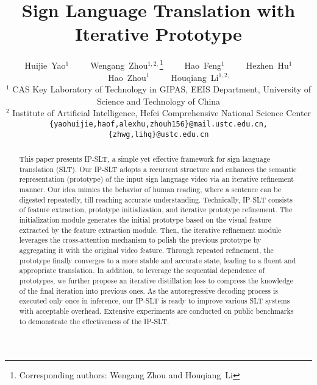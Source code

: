 \documentclass[10pt,twocolumn,letterpaper]{article}
\begin{document}
\title{Sign Language Translation with Iterative Prototype}

\author{Huijie~Yao$^{1}$~~~~~Wengang~Zhou$^{1,2,}$\thanks{Corresponding authors: Wengang Zhou and Houqiang~Li}~~~~~Hao~Feng$^{1}$~~~~~Hezhen~Hu$^{1}$~~~~~Hao~Zhou$^{1}$~~~~~Houqiang~Li$^{1,2,}$\footnotemark[1] \\
{\normalsize $^{1}$ CAS Key Laboratory of Technology in GIPAS, EEIS Department, University of Science and Technology of China} \\
{\normalsize $^{2}$ Institute of Artificial Intelligence, Hefei Comprehensive National Science Center} \\
{\tt\small \{yaohuijie,haof,alexhu,zhouh156\}@mail.ustc.edu.cn, \{zhwg,lihq\}@ustc.edu.cn}
}


\maketitle

\ificcvfinal\thispagestyle{empty}\fi

\begin{abstract}
This paper presents IP-SLT, a simple yet effective framework for sign language translation (SLT). Our IP-SLT adopts a recurrent structure and enhances the semantic representation (prototype) of the input sign language video via an iterative refinement manner. Our idea mimics the behavior of human reading, where a sentence can be digested repeatedly, till reaching accurate understanding. Technically, IP-SLT consists of feature extraction, prototype initialization, and iterative prototype refinement. The initialization module generates the initial prototype based on the visual feature extracted by the feature extraction module. Then, the iterative refinement module leverages the cross-attention mechanism to polish the previous prototype by aggregating it with the original video feature. Through repeated refinement, the prototype finally converges to a more stable and accurate state, leading to a fluent and appropriate translation. In addition, to leverage the sequential dependence of prototypes, we further propose an iterative distillation loss to compress the knowledge of the final iteration into previous ones. As the autoregressive decoding process is executed only once in inference, our IP-SLT is ready to improve various SLT systems with acceptable overhead. Extensive experiments are conducted on public benchmarks to demonstrate the effectiveness of the IP-SLT.
\end{abstract}
\end{document}
